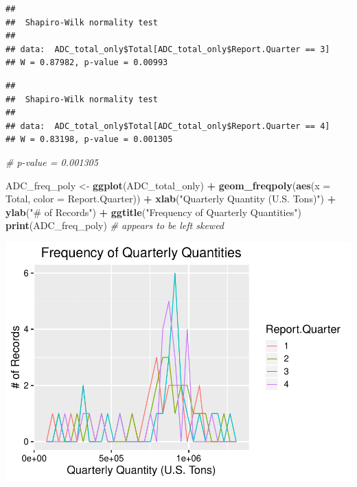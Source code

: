 \documentclass[12pt,]{article}
\newenvironment{Shaded}{\begin{snugshade}}{\end{snugshade}}
\newcommand{\KeywordTok}[1]{\textcolor[rgb]{0.13,0.29,0.53}{\textbf{#1}}}
\newcommand{\DataTypeTok}[1]{\textcolor[rgb]{0.13,0.29,0.53}{#1}}
\newcommand{\DecValTok}[1]{\textcolor[rgb]{0.00,0.00,0.81}{#1}}
\newcommand{\StringTok}[1]{\textcolor[rgb]{0.31,0.60,0.02}{#1}}
\newcommand{\CommentTok}[1]{\textcolor[rgb]{0.56,0.35,0.01}{\textit{#1}}}
\newcommand{\OperatorTok}[1]{\textcolor[rgb]{0.81,0.36,0.00}{\textbf{#1}}}
\newcommand{\NormalTok}[1]{#1}
\begin{document}
\begin{verbatim}
## 
##  Shapiro-Wilk normality test
## 
## data:  ADC_total_only$Total[ADC_total_only$Report.Quarter == 3]
## W = 0.87982, p-value = 0.00993
\end{verbatim}

\begin{Shaded}
\end{Shaded}

\begin{verbatim}
## 
##  Shapiro-Wilk normality test
## 
## data:  ADC_total_only$Total[ADC_total_only$Report.Quarter == 4]
## W = 0.83198, p-value = 0.001305
\end{verbatim}

\begin{Shaded}
\begin{Highlighting}[]
\CommentTok{# p-value = 0.001305}

\NormalTok{ADC_freq_poly <-}\StringTok{ }\KeywordTok{ggplot}\NormalTok{(ADC_total_only) }\OperatorTok{+}
\StringTok{  }\KeywordTok{geom_freqpoly}\NormalTok{(}\KeywordTok{aes}\NormalTok{(}\DataTypeTok{x =}\NormalTok{ Total, }\DataTypeTok{color =}\NormalTok{ Report.Quarter)) }\OperatorTok{+}\StringTok{ }
\StringTok{  }\KeywordTok{xlab}\NormalTok{(}\StringTok{"Quarterly Quantity (U.S. Tons)"}\NormalTok{) }\OperatorTok{+}\StringTok{ }
\StringTok{  }\KeywordTok{ylab}\NormalTok{(}\StringTok{"# of Records"}\NormalTok{) }\OperatorTok{+}\StringTok{ }
\StringTok{  }\KeywordTok{ggtitle}\NormalTok{(}\StringTok{"Frequency of Quarterly Quantities"}\NormalTok{)}
\KeywordTok{print}\NormalTok{(ADC_freq_poly) }\CommentTok{# appears to be left skewed}
\end{Highlighting}
\end{Shaded}

\includegraphics{SKo_Project_Template_files/figure-latex/Test1_1-1.pdf}
\end{document}
